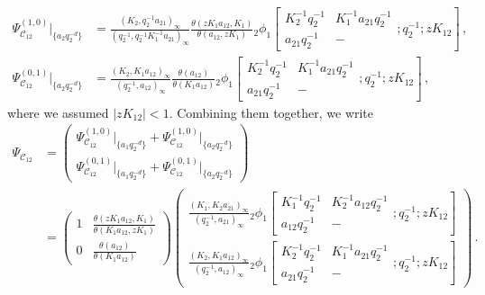 \begin{subequations}
\begin{align}
    \Psi_{\mathscr{C}_{12}}^{(1,0)}\Big|_{\{a_2 q_2^{-d}\}} 
    & = \frac{(K_2,q_2^{-1} a_{21})_\infty}{(q_2^{-1},q_2^{-1} K_1^{-1} a_{21})_\infty} \frac{\theta(z K_1 a_{12},K_1)}{\theta(a_{12},z K_1)} {_2\phi_1}\left[ 
    \begin{matrix}
        K_2^{-1}q_2^{-1} & K_1^{-1} a_{21} q_2^{-1} \\ a_{21} q_2^{-1} & -
    \end{matrix} ; q_2^{-1}; z K_{12} \right]   
    \, , \\
    \Psi_{\mathscr{C}_{12}}^{(0,1)}\Big|_{\{a_2 q_2^{-d}\}} 
    & = \frac{(K_2,K_1 a_{12})_\infty}{(q_2^{-1},a_{12})_\infty} \frac{\theta(a_{12}) }{\theta(K_1 a_{12}) }{_2\phi_1}\left[ 
    \begin{matrix}
        K_2^{-1}q_2^{-1} & K_1^{-1} a_{21} q_2^{-1} \\ a_{21} q_2^{-1} & -
    \end{matrix} ; q_2^{-1}; z K_{12} \right]      
    \, ,
\end{align}
\end{subequations}
where we assumed $|z K_{12}| < 1$.
Combining them together, we write
\begin{align}
    \Psi_{\mathscr{C}_{12}} & =
    \begin{pmatrix}
        \Psi_{\mathscr{C}_{12}}^{(1,0)}\Big|_{\{a_1 q_2^{-d}\}} + \Psi_{\mathscr{C}_{12}}^{(1,0)}\Big|_{\{a_2 q_2^{-d}\}} \\ \Psi_{\mathscr{C}_{12}}^{(0,1)}\Big|_{\{a_1 q_2^{-d}\}} + \Psi_{\mathscr{C}_{12}}^{(0,1)}\Big|_{\{a_2 q_2^{-d}\}}
    \end{pmatrix}
    \nonumber \\
    & =
    \begin{pmatrix}
            1 & \displaystyle \frac{\theta(z K_1 a_{12},K_1)}{\theta(K_1 a_{12},z K_1) } \\ 
            0 & \displaystyle \frac{\theta(a_{12}) }{\theta(K_1 a_{12}) }
    \end{pmatrix}
    \begin{pmatrix}
        \displaystyle \frac{(K_1,K_2 a_{21})_\infty}{(q_2^{-1},a_{21})_\infty} {_2\phi_1}\left[ 
    \begin{matrix}
        K_1^{-1}q_2^{-1} & K_2^{-1} a_{12} q_2^{-1} \\ a_{12} q_2^{-1} & -
    \end{matrix} ; q_2^{-1}; z K_{12} \right]
    \\[1.5em] \displaystyle
    \frac{(K_2,K_1 a_{12})_\infty}{(q_2^{-1},a_{12})_\infty} {_2\phi_1}\left[ 
    \begin{matrix}
        K_2^{-1}q_2^{-1} & K_1^{-1} a_{21} q_2^{-1} \\ a_{21} q_2^{-1} & -
    \end{matrix} ; q_2^{-1}; z K_{12} \right]
    \end{pmatrix}    
    \, .
\end{align}
